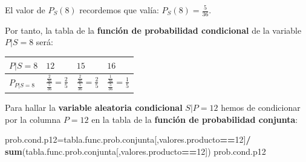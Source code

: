\documentclass[]{book}
\newenvironment{Shaded}{\begin{snugshade}}{\end{snugshade}}
\newcommand{\DecValTok}[1]{\textcolor[rgb]{0.00,0.00,0.81}{#1}}
\newcommand{\KeywordTok}[1]{\textcolor[rgb]{0.13,0.29,0.53}{\textbf{#1}}}
\newcommand{\NormalTok}[1]{#1}
\newcommand{\OperatorTok}[1]{\textcolor[rgb]{0.81,0.36,0.00}{\textbf{#1}}}
\newcommand{\StringTok}[1]{\textcolor[rgb]{0.31,0.60,0.02}{#1}}
\begin{document}
El valor de \(P_S(8)\) recordemos que valía: \(P_S(8)=\frac{5}{36}\).

Por tanto, la tabla de la \textbf{función de probabilidad condicional} de la variable \(P|S=8\) será:

\begin{longtable}[]{@{}llll@{}}
\toprule
\begin{minipage}[b]{0.22\columnwidth}\raggedright
\(P|S=8\)\strut
\end{minipage} & \begin{minipage}[b]{0.22\columnwidth}\raggedright
\(12\)\strut
\end{minipage} & \begin{minipage}[b]{0.22\columnwidth}\raggedright
\(15\)\strut
\end{minipage} & \begin{minipage}[b]{0.22\columnwidth}\raggedright
\(16\)\strut
\end{minipage}\tabularnewline
\midrule
\endhead
\begin{minipage}[t]{0.22\columnwidth}\raggedright
\(P_{P|S=8}\)\strut
\end{minipage} & \begin{minipage}[t]{0.22\columnwidth}\raggedright
\(\frac{\frac{2}{36}}{\frac{5}{36}}=\frac{2}{5}\)\strut
\end{minipage} & \begin{minipage}[t]{0.22\columnwidth}\raggedright
\(\frac{\frac{2}{36}}{\frac{5}{36}}=\frac{2}{5}\)\strut
\end{minipage} & \begin{minipage}[t]{0.22\columnwidth}\raggedright
\(\frac{\frac{1}{36}}{\frac{5}{36}}=\frac{1}{5}\)\strut
\end{minipage}\tabularnewline
\bottomrule
\end{longtable}

Para hallar la \textbf{variable aleatoria condicional} \(S|P=12\) hemos de condicionar por la columna \(P=12\) en la tabla de la \textbf{función de probabilidad conjunta}:

\begin{Shaded}
\begin{Highlighting}[]
\NormalTok{prob.cond.p12=tabla.func.prob.conjunta[,valores.producto}\OperatorTok{==}\DecValTok{12}\NormalTok{]}\OperatorTok{/}
\StringTok{  }\KeywordTok{sum}\NormalTok{(tabla.func.prob.conjunta[,valores.producto}\OperatorTok{==}\DecValTok{12}\NormalTok{])}
\NormalTok{prob.cond.p12}
\end{Highlighting}
\end{Shaded}
\end{document}
